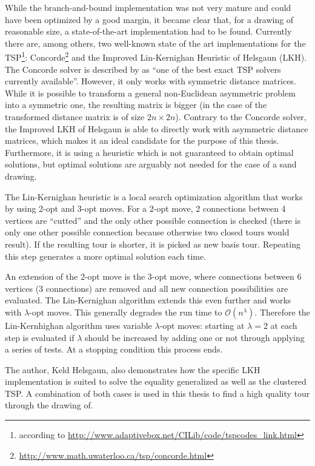 While the branch-and-bound implementation was not very mature and could have been optimized by a good margin, it became clear that, for a drawing of reasonable size, a state-of-the-art implementation had to be found. Currently there are, among others, two well-known state of the art implementations for the TSP\footnote{according to \url{http://www.adaptivebox.net/CILib/code/tspcodes_link.html}}: Concorde\footnote{\url{http://www.math.uwaterloo.ca/tsp/concorde.html}} and the Improved Lin-Kernighan Heuristic of Helsgaun (LKH)\cite{helsgaun2000effective}\cite{kernighan1970efficient}. The Concorde solver is described by \cite{hornik2007tsp} as \enquote{one of the best exact TSP solvers currently available}. However, it only works with symmetric distance matrices. While it is possible to transform a general non-Euclidean asymmetric problem into a symmetric one, the resulting matrix is bigger (in the case of \cite{kumar1996asymmetric} the transformed distance matrix is of size $2n \times 2n$). Contrary to the Concorde solver, the Improved LKH of Helsgaun is able to directly work with asymmetric distance matrices, which makes it an ideal candidate for the purpose of this thesis. Furthermore, it is using a heuristic which is not guaranteed to obtain optimal solutions, but optimal solutions are arguably not needed for the case of a sand drawing.

The Lin-Kernighan heuristic is a local search optimization algorithm that works by using 2-opt and 3-opt moves. For a 2-opt move, 2 connections between 4 vertices are \enquote{cutted} and the only other  possible connection is checked (there is only one other possible connection because otherwise two closed tours would result). If the resulting tour is shorter, it is picked as new basis tour. Repeating this step generates a more optimal solution each time.

An extension of the 2-opt move is the 3-opt move, where connections between 6 vertices (3 connections) are removed and all new connection possibilities are evaluated. The Lin-Kernighan algorithm extends this even further and works with $\lambda\text{-opt}$ moves. This generally degrades the run time to $\mathcal{O}(n^\lambda)$. Therefore the Lin-Kernhighan algorithm uses variable $\lambda\text{-opt}$ moves: starting at $\lambda=2$ at each step is evaluated if $\lambda$ should be increased by adding one or not through applying a series of tests. At a stopping condition this process ends.

The author, Keld Helsgaun, also demonstrates how the specific LKH implementation is suited to solve the equality generalized\citep{helsgaun2013equality} as well as the clustered TSP\cite{helsgaun2014solving}. A combination of both cases is used in this thesis to find a high quality tour through the drawing of.

